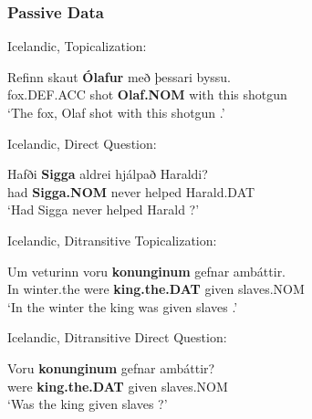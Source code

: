\subsubsection{Passive Data}
\begin{exe}
	 Icelandic, Topicalization:
\begin{xlist}
	\ex \gll Refinn skaut \textbf{Ólafur} með  þessari byssu.\\
	fox.DEF.ACC shot \textbf{Olaf.NOM} with this shotgun\\
\trans `The fox, Olaf shot with this shotgun \citep[ex. 19a]{Zaenen.1985}.'
\end{xlist}
 Icelandic, Direct Question:
\begin{xlist}
	\ex \gll Hafði \textbf{Sigga} aldrei hjálpað Haraldi?\\
	had \textbf{Sigga.NOM} never helped Harald.DAT\\
\trans `Had Sigga never helped Harald \citep[ex. 20b]{Zaenen.1985}?'
\end{xlist}
	 Icelandic, Ditransitive Topicalization:
\begin{xlist}
	\ex \gll Um veturinn voru \textbf{konunginum} gefnar amb\'{a}ttir.\\
In winter.the were \textbf{king.the.DAT} given slaves.NOM\\
\trans `In the winter the king was given slaves \citep[ex. 47a]{Zaenen.1985}.'
\end{xlist}
 Icelandic, Ditransitive Direct Question:
\begin{xlist}
	\ex \gll Voru \textbf{konunginum} gefnar amb\'{a}ttir?\\
were \textbf{king.the.DAT} given slaves.NOM\\
\trans `Was the king given slaves \citep[ex. 48a]{Zaenen.1985}?'
\end{xlist}



\end{exe}
